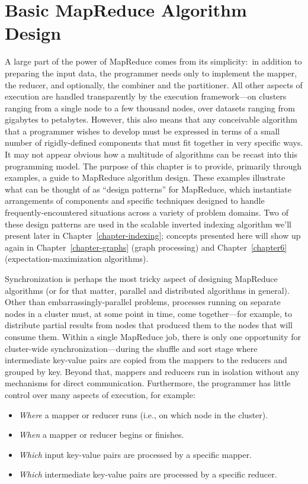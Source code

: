 \chapter{Basic MapReduce Algorithm Design}
\label{chapter3}

A large part of the power of MapReduce comes from its simplicity:\ in
addition to preparing the input data, the programmer needs only to
implement the mapper, the reducer, and optionally, the combiner and
the partitioner.  All other aspects of execution are handled
transparently by the execution framework---on clusters ranging from a
single node to a few thousand nodes, over datasets ranging from
gigabytes to petabytes.  However, this also means that any conceivable
algorithm that a programmer wishes to develop must be expressed in
terms of a small number of rigidly-defined components that must fit
together in very specific ways.  It may not appear obvious how a
multitude of algorithms can be recast into this programming model.
The purpose of this chapter is to provide, primarily through examples,
a guide to MapReduce algorithm design.  These examples illustrate what
can be thought of as ``design patterns'' for MapReduce, which
instantiate arrangements of components and specific techniques
designed to handle frequently-encountered situations across a variety
of problem domains.  Two of these design patterns are used in the
scalable inverted indexing algorithm we'll present later in
Chapter~\ref{chapter-indexing}; concepts presented here will show up
again in Chapter~\ref{chapter-graphs} (graph processing) and
Chapter~\ref{chapter6} (expectation-maximization algorithms).

Synchronization is perhaps the most tricky aspect of designing
MapReduce algorithms (or for that matter, parallel and distributed
algorithms in general).  Other than embarrassingly-parallel problems,
processes running on separate nodes in a cluster must, at some point
in time, come together---for example, to distribute partial results
from nodes that produced them to the nodes that will consume them.
Within a single MapReduce job, there is only one opportunity for
cluster-wide synchronization---during the shuffle and sort stage where
intermediate key-value pairs are copied from the mappers to the
reducers and grouped by key.  Beyond that, mappers and reducers run in
isolation without any mechanisms for direct communication.
Furthermore, the programmer has little control over many aspects of
execution, for example:

\begin{itemize}

\item \emph{Where} a mapper or reducer runs (i.e., on which node in the
  cluster).

\item \emph{When} a mapper or reducer begins or finishes.

\item \emph{Which} input key-value pairs are processed by a specific
  mapper.

\item \emph{Which} intermediate key-value pairs are processed by a
  specific reducer.

\end{itemize}

